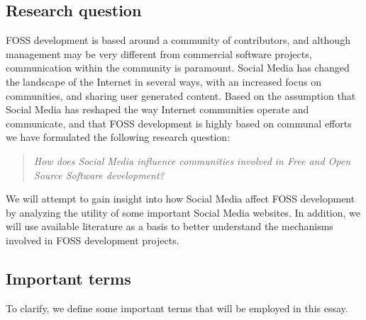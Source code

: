 \documentclass[a4paper,11pt]{article} %
\begin{document}
\subsection{Research question}

FOSS development is based around a community of contributors, and
although management may be very different from commercial software
projects, communication within the community is paramount. Social
Media has changed the landscape of the Internet in several ways, with
an increased focus on communities, and sharing user generated
content\cite{Kaplan201059}.  Based on the assumption that Social Media
has reshaped the way Internet communities operate and communicate, and
that FOSS development is highly based on communal efforts we have
formulated the following research question:
\begin{quote}
  \textit{How does Social Media influence communities involved in Free
    and Open Source Software development?}
\end{quote}

We will attempt to gain insight into how Social Media affect FOSS development
by analyzing the utility of some important Social Media websites. In addition,
we will use available literature as a basis to better understand the mechanisms
involved in FOSS development projects. 


\subsection{Important terms}

To clarify, we define some important terms that will be employed in this essay.
\end{document}
